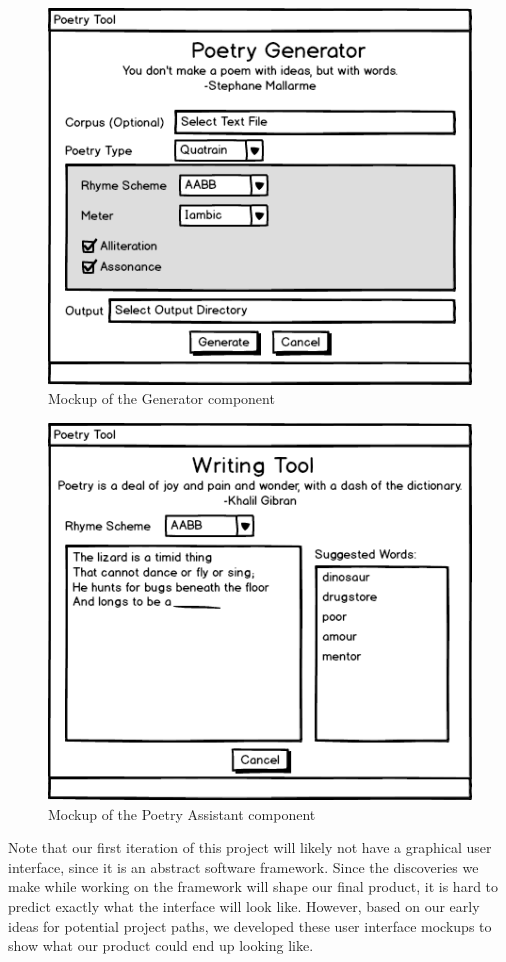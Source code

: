 \documentclass[10pt, letter,twocolumn]{IEEEtran}
\begin{document}
\begin{figure}[ht]
  \centering
    \includegraphics[scale=0.5]{Images/generate}
    \caption{Mockup of the Generator component}
  \label{gui3}
\end{figure}

\begin{figure}[ht]
  \centering
    \includegraphics[scale=0.5]{Images/tool}
    \caption{Mockup of the Poetry Assistant component}
  \label{gui4}
\end{figure}

Note that our first iteration of this project will likely not have a graphical user interface, since it is an abstract software framework.  Since the discoveries we make while working on the framework will shape our final product, it is hard to predict exactly what the interface will look like.  However, based on our early ideas for potential project paths, we developed these user interface mockups to show what our product could end up looking like.




\end{document}
